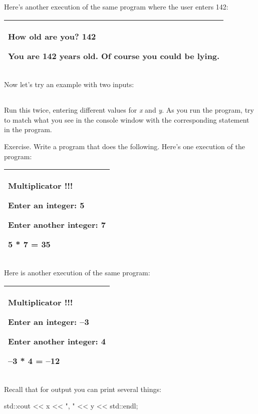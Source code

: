 \documentclass[
]{article}
\begin{document}
Here's another execution of the same program where the user enters 142:

\begin{longtable}[]{@{}l@{}}
\toprule
\endhead
\begin{minipage}[t]{0.97\columnwidth}\raggedright
How old are you? \textbf{142}

You are 142 years old. Of course you could be lying.\strut
\end{minipage}\tabularnewline
\bottomrule
\end{longtable}

Now let's try an example with two inputs:

\begin{longtable}[]{@{}@{}}
\toprule
\endhead
\bottomrule
\end{longtable}

Run this twice, entering different values for \emph{x} and \emph{y}. As
you run the program, try to match what you see in the console window
with the corresponding statement in the program.

Exercise. Write a program that does the following. Here's one execution
of the program:

\begin{longtable}[]{@{}l@{}}
\toprule
\endhead
\begin{minipage}[t]{0.97\columnwidth}\raggedright
Multiplicator !!!

Enter an integer: \textbf{5}

Enter another integer: \textbf{7}

5 * 7 = 35\strut
\end{minipage}\tabularnewline
\bottomrule
\end{longtable}

Here is another execution of the same program:

\begin{longtable}[]{@{}l@{}}
\toprule
\endhead
\begin{minipage}[t]{0.97\columnwidth}\raggedright
Multiplicator !!!

Enter an integer: --\textbf{3}

Enter another integer: \textbf{4}

--3 * 4 = --12\strut
\end{minipage}\tabularnewline
\bottomrule
\end{longtable}

Recall that for output you can print several things:

std::cout \textless\textless{} x \textless\textless{} ", "
\textless\textless{} y \textless\textless{} std::endl;
\end{document}
